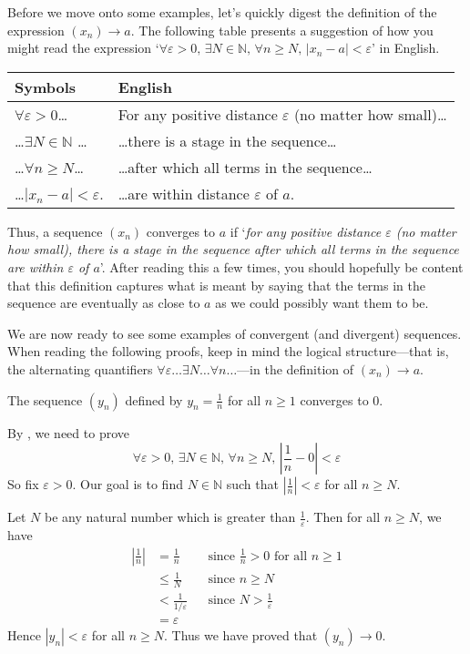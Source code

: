 Before we move onto some examples, let's quickly digest the definition of the expression $(x_n) \to a$. The following table presents a suggestion of how you might read the expression `$\forall \varepsilon > 0,\, \exists N \in \mathbb{N},\, \forall n \ge N,\, |x_n-a| < \varepsilon$' in English.
\begin{center}
\begin{tabular}{ll}
Symbols & English \\
\hline
$\forall \varepsilon > 0$\dots{} & For any positive distance $\varepsilon$ (no matter how small)\dots{} \\
\dots{}$\exists N \in \mathbb{N}$ \dots{} & \dots{}there is a stage in the sequence\dots{} \\
\dots{}$\forall n \ge N$\dots{} & \dots{}after which all terms in the sequence\dots{} \\
\dots{}$|x_n-a| < \varepsilon$. & \dots{}are within distance $\varepsilon$ of $a$.
\end{tabular}
\end{center}

Thus, a sequence $(x_n)$ converges to $a$ if `\textit{for any positive distance $\varepsilon$ (no matter how small), there is a stage in the sequence after which all terms in the sequence are within $\varepsilon$ of $a$}'. After reading this a few times, you should hopefully be content that this definition captures what is meant by saying that the terms in the sequence are eventually as close to $a$ as we could possibly want them to be.

We are now ready to see some examples of convergent (and divergent) sequences. When reading the following proofs, keep in mind the logical structure---that is, the alternating quantifiers $\forall \varepsilon \dots \exists N \dots \forall n \dots$---in the definition of $(x_n) \to a$.

\begin{proposition}
\label{propOneOverNConvergence}
The sequence $(y_n)$ defined by $y_n=\frac{1}{n}$ for all $n \ge 1$ converges to $0$.
\end{proposition}

\begin{cproof}
By , we need to prove
\[ \forall \varepsilon > 0,\, \exists N \in \mathbb{N},\, \forall n \ge N,\, \left|\frac{1}{n}-0\right| < \varepsilon \]
So fix $\varepsilon > 0$. Our goal is to find $N \in \mathbb{N}$ such that $\left|\frac{1}{n}\right| < \varepsilon$ for all $n \ge N$.

Let $N$ be any natural number which is greater than $\frac{1}{\varepsilon}$. Then for all $n \ge N$, we have
\begin{align*}
\left| \frac{1}{n} \right| &= \frac{1}{n} && \text{since $\frac{1}{n}>0$ for all $n \ge 1$} \\
&\le \frac{1}{N} && \text{since $n \ge N$} \\
&< \frac{1}{1/\varepsilon} && \text{since $N > \frac{1}{\varepsilon}$} \\
&=\varepsilon &&
\end{align*}
Hence $|y_n| < \varepsilon$ for all $n \ge N$. Thus we have proved that $(y_n) \to 0$.
\end{cproof}

